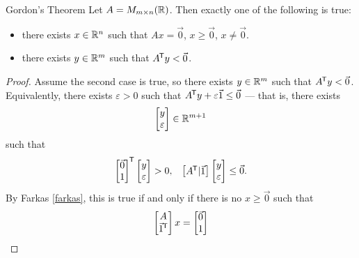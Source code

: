 \begin{thm}{Gordon's Theorem}\label{gordons}\proofbreak
    Let $A = M_{m \times n}(\mathbb{R})$. Then exactly one of the following is true:
    \begin{itemize}
        \item there exists $x \in \mathbb{R}^n$ such that $Ax = \vec{0}$, $x \geq \vec{0}$, $x \neq \vec{0}$.
        \item there exists $y \in \mathbb{R}^m$ such that ${A}^{\mkern-1.5mu\mathsf{T}}y < \vec{0}$.
    \end{itemize}
\end{thm}

\begin{proof}
    Assume the second case is true, so there exists $y \in \mathbb{R}^m$ such that ${A}^{\mkern-1.5mu\mathsf{T}}y < \vec{0}$. Equivalently, there exists $\varepsilon > 0$ such that ${A}^{\mkern-1.5mu\mathsf{T}}y + \varepsilon\vec{1} \leq \vec{0}$ --- that is, there exists
    \begin{align*}
        \begin{bmatrix}
            y \\ \varepsilon
        \end{bmatrix} \in \mathbb{R}^{m+1}
    \end{align*}
    such that
    \begin{align*}
        {\begin{bmatrix}
            \vec{0} \\ 1
        \end{bmatrix}}^{\mkern-1.5mu\mathsf{T}}
        \begin{bmatrix}
            y \\ \varepsilon
        \end{bmatrix} > 0,\;\;\;\begin{bmatrix}
            {A}^{\mkern-1.5mu\mathsf{T}} | \vec{1}
        \end{bmatrix}\begin{bmatrix}
            y \\ \varepsilon
        \end{bmatrix} \leq \vec{0}.
    \end{align*}
    By Farkas \ref{farkas}, this is true if and only if there is no $x \geq \vec{0}$ such that
    \begin{align*}
        \begin{bmatrix}
            A \\ {\vec{1}}^{\mkern-1.5mu\mathsf{T}}
        \end{bmatrix}x = \begin{bmatrix}
            \vec{0} \\ 1

\end{bmatrix}
\end{align*}
\end{proof}
